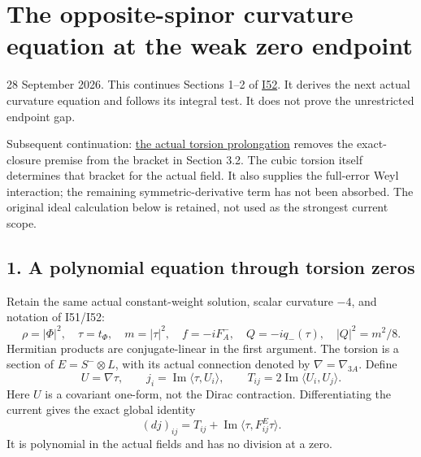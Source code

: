\documentclass[
  10pt,
]{article}
\author{}
\date{}
\begin{document}
\hypertarget{the-opposite-spinor-curvature-equation-at-the-weak-zero-endpoint}{%
\section{The opposite-spinor curvature equation at the weak zero
endpoint}\label{the-opposite-spinor-curvature-equation-at-the-weak-zero-endpoint}}

28 September 2026. This continues Sections 1--2 of
\href{20260927_endpoint_covariance_and_surgery_limits.md}{I52}. It
derives the next actual curvature equation and follows its integral
test. It does not prove the unrestricted endpoint gap.

Subsequent continuation:
\href{20260928_actual_torsion_prolongation.md}{the actual torsion
prolongation} removes the exact-closure premise from the bracket in
Section 3.2. The cubic torsion itself determines that bracket for the
actual field. It also supplies the full-error Weyl interaction; the
remaining symmetric-derivative term has not been absorbed. The original
ideal calculation below is retained, not used as the strongest current
scope.

\hypertarget{a-polynomial-equation-through-torsion-zeros}{%
\subsection{1. A polynomial equation through torsion
zeros}\label{a-polynomial-equation-through-torsion-zeros}}

Retain the same actual constant-weight solution, scalar curvature
\(-4\), and notation of I51/I52: \[
 \rho=|\Phi|^2,\quad \tau=t_\Phi,\quad m=|\tau|^2,\quad
 f=-iF_A^-,\quad Q=-iq_-(\tau),\quad |Q|^2=m^2/8.
\] Hermitian products are conjugate-linear in the first argument. The
torsion is a section of \(E=S^-\otimes L\), with its actual connection
denoted by \(\nabla=\nabla_{3A}\). Define \[
 U=\nabla\tau,\qquad j_i=\operatorname{Im}\langle\tau,U_i\rangle,
 \qquad T_{ij}=2\operatorname{Im}\langle U_i,U_j\rangle .
\] Here \(U\) is a covariant one-form, not the Dirac contraction.
Differentiating the current gives the exact global identity \[
 (dj)_{ij}=T_{ij}+
           \operatorname{Im}\langle\tau,F^E_{ij}\tau\rangle .
                                                               \tag{1.1}
\] It is polynomial in the actual fields and has no division at a zero.
\end{document}
